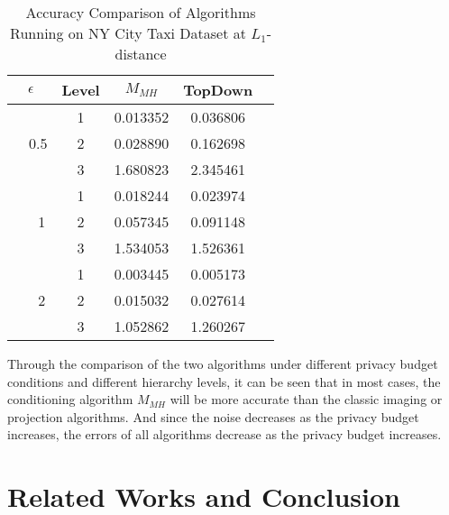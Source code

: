 \documentclass[11pt]{article}
\begin{document}
    
 \begin{table}[htbp]
\begin{center}
 \caption{Accuracy Comparison of Algorithms Running on NY City Taxi Dataset at $L_1$-distance}
\begin{tabular}{ |c|c|c|c| c| } 
\hline
$\epsilon$ & Level & $M_{MH}$  & TopDown \\
\hline
\multirow{3}{4em}{\quad\ \ 0.5} & 1 &0.013352& 0.036806 \\ 
& 2 & 0.028890 & 0.162698 \\ 
& 3 & 1.680823 & 2.345461 \\ 
\hline
\multirow{3}{4em}{\quad\ \ \ 1} & 1 & 0.018244 & 0.023974 \\ 
& 2 &0.057345 & 0.091148 \\ 
& 3 & 1.534053 & 1.526361 \\
\hline
\multirow{3}{4em}{\quad\ \ \ 2} & 1  & 0.003445 & 0.005173 \\ 
& 2 & 0.015032 & 0.027614 \\ 
& 3 & 1.052862 & 1.260267\\
\hline
\end{tabular}
\label{comparison-results}
\end{center}
\end{table}


Through the comparison of the two algorithms under different privacy budget conditions and different hierarchy levels, it can be seen that in most cases, the conditioning algorithm $M_{MH}$  will be more accurate than the classic imaging or projection algorithms. And since the noise decreases as the privacy budget increases, the errors of all algorithms decrease as the privacy budget increases.




\section{Related Works and Conclusion}
\end{document}
